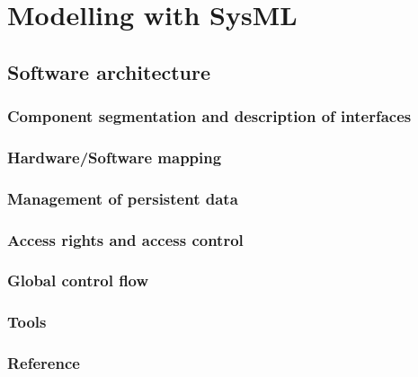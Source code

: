 \section{Modelling with SysML}
\subsection{Software architecture}
\subsubsection{Component segmentation and description of interfaces}
\subsubsection{Hardware/Software mapping}
\subsubsection{Management of persistent data}
\subsubsection{Access rights and access control}
\subsubsection{Global control flow}
\subsubsection{Tools}
\subsubsection{Reference}
